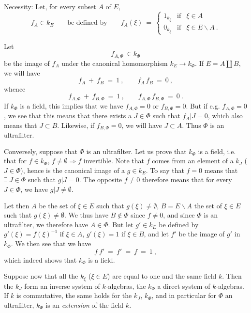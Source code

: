 \documentclass[11pt]{article}
\newcommand{\msp}[1]{\marginpar{\footnotesize [#1]}}
\begin{document}
\noindent Necessity: Let, for every subset $A$ of $E$,
\[
f_A\in k_E \qquad \text{be defined by} \qquad f_A(\xi) \ = \ \left\{
\begin{array}{lll}
1_{k_\xi} & \text{if} & \xi\in A\\[1ex]
0_{k_\xi} & \text{if} & \xi\in E\backslash A \ .
\end{array}\right.
\]

\msp{page 3}
\noindent Let
\[
f_{A,\Phi} \ \in k_\Phi
\]
be the image of $f_A$ under the canonical homomorphism $k_E\longrightarrow k_\Phi$. If $E=A\amalg B$, we will have
\[
f_A \ + \ f_B \ = \ 1 \ , \qquad f_A\, f_B \ = \ 0 \ ,
\]
whence
\[
f_{A,\Phi} \ + \ f_{B,\Phi} \ = \ 1 \ , \qquad f_{A,\Phi}\, f_{B,\Phi} \ = \ 0 \ .
\]
If $k_\Phi$ is a field, this implies that we have $f_{A,\Phi}=0$ or $f_{B,\Phi}=0$. But if e.g. $f_{A,\Phi}=0$, we see that this means that there exists a $J\in\Phi$ such that $f_A|J=0$, which also means that $J\subset B$. Likewise, if $f_{B,\Phi}=0$, we will have $J\subset A$. Thus $\Phi$ is an ultrafilter.

\noindent Conversely, suppose that $\Phi$ is an ultrafilter. Let us prove that $k_\Phi$ is a field, i.e. that for $f\in k_\Phi$, $f\neq\emptyset\Longrightarrow f$ invertible. Note that $f$ comes from an element of a $k_J$ ($J\in\Phi$), hence is the canonical image of a $g\in k_E$. To say that $f=0$ means that $\exists\ J\in\Phi$ such that $g|J=0$. The opposite $f\neq0$ therefore means that for every $J\in\Phi$, we have $g|J\neq\emptyset$.

\msp{page 4}
\noindent Let then $A$ be the set of $\xi\in E$ such that $g(\xi)\neq\emptyset$, $B=E\backslash A$ the set of $\xi\in E$ such that $g(\xi)\neq\emptyset$. We thus have $B\notin\Phi$ since $f\neq0$, and since $\Phi$ is an ultrafilter, we therefore have $A\in\Phi$. But let $g'\in k_E$ be defined by $g'(\xi)=f(\xi)^{-1}$ if $\xi\in A$, $g'(\xi)=1$ if $\xi\in B$, and let $f'$ be the image of $g'$ in $k_\Phi$. We then see that we have %
\[
f\ f' \ = \ f' \ = \ f \ = \ 1 \ ,
\]
which indeed shows that $k_\Phi$ is a field.

\noindent Suppose now that all the $k_\xi$ ($\xi\in E$) are equal to one and the same field $k$. Then the $k_J$ form an inverse system of $k$-algebras, the $k_\Phi$ a direct system of $k$-algebras. If $k$ is commutative, the same holds for the $k_J$, $k_\Phi$, and in particular for $\Phi$ an ultrafilter, $k_\Phi$ is an \textit{extension} of the field $k$.
\end{document}
